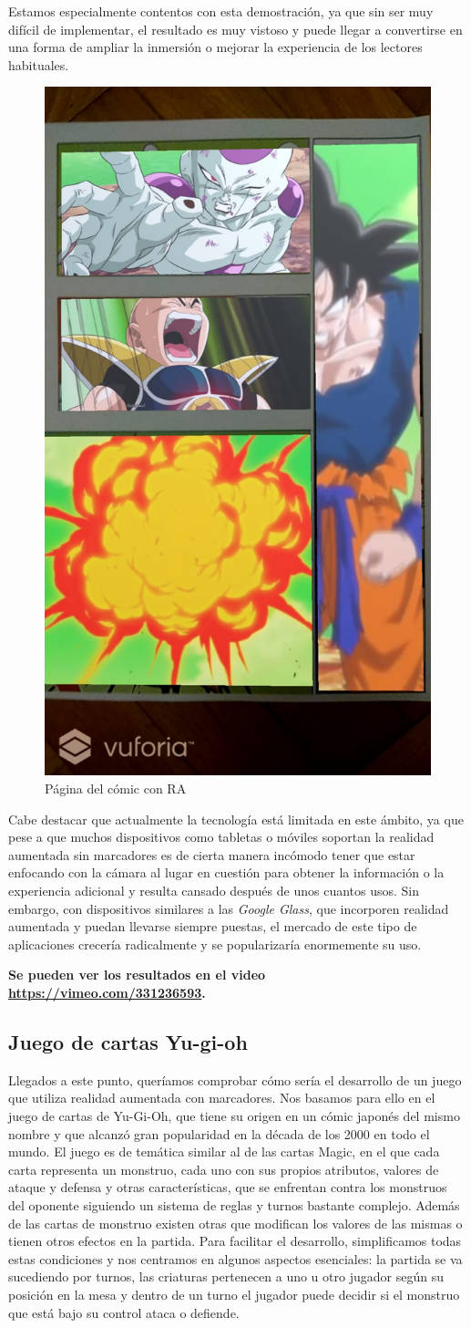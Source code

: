 Estamos especialmente contentos con esta demostración, ya que sin ser muy difícil de implementar, el resultado es muy vistoso y puede llegar a convertirse en una forma de ampliar la inmersión o mejorar la experiencia de los lectores habituales.
\begin{figure}[H]
    \centering
    \includegraphics[width=0.3\linewidth]{Images/DragonBall.jpeg}
    \caption{Página del cómic con RA}
    \label{DBZ}
\end{figure}

Cabe destacar que actualmente la tecnología está limitada en este ámbito, ya que pese a que muchos dispositivos como tabletas o móviles soportan la realidad aumentada sin marcadores es de cierta manera incómodo tener que estar enfocando con la cámara al lugar en cuestión para obtener la información o la experiencia adicional y resulta cansado después de unos cuantos usos. Sin embargo, con dispositivos similares a las \textit{Google Glass}, que incorporen realidad aumentada y puedan llevarse siempre puestas, el mercado de este tipo de aplicaciones crecería radicalmente y se popularizaría enormemente su uso.

\textbf{Se pueden ver los resultados en el video \url{https://vimeo.com/331236593}.}

\subsection{Juego de cartas Yu-gi-oh}
Llegados a este punto, queríamos comprobar cómo sería el desarrollo de un juego que utiliza realidad aumentada con marcadores. Nos basamos para ello en el juego de cartas de Yu-Gi-Oh, que tiene su origen en un cómic japonés del mismo nombre y que alcanzó gran popularidad en la década de los 2000 en todo el mundo. El juego es de temática similar al de las cartas Magic, en el que cada carta representa un monstruo, cada uno con sus propios atributos, valores de ataque y defensa y otras características, que se enfrentan contra los monstruos del oponente siguiendo un sistema de reglas y turnos bastante complejo. Además de las cartas de monstruo existen otras que modifican los valores de las mismas o tienen otros efectos en la partida. Para facilitar el desarrollo, simplificamos todas estas condiciones y nos centramos en algunos aspectos esenciales: la partida se va sucediendo por turnos, las criaturas pertenecen a uno u otro jugador según su posición en la mesa y dentro de un turno el jugador puede decidir si el monstruo que está bajo su control ataca o defiende.\\

